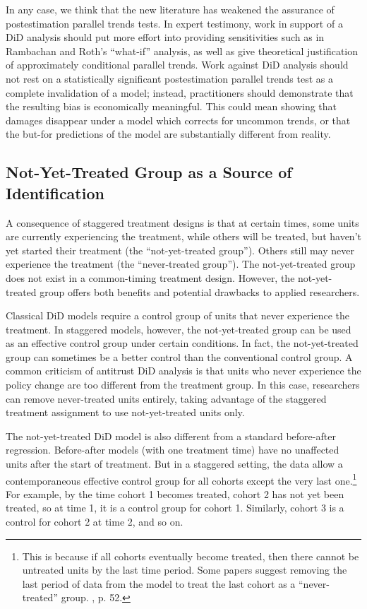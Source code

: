 \documentclass[12pt]{article}
\begin{document}
In any case, we think that the new literature has weakened the assurance of postestimation parallel trends tests. In expert testimony, work in support of a DiD analysis should put more effort into providing sensitivities such as in Rambachan and Roth’s “what-if” analysis, as well as give theoretical justification of approximately conditional parallel trends. Work against DiD analysis should not rest on a statistically significant postestimation parallel trends test as a complete invalidation of a model; instead, practitioners should demonstrate that the resulting bias is economically meaningful. This could mean showing that damages disappear under a model which corrects for uncommon trends, or that the but-for predictions of the model are substantially different from reality.
\subsection{Not-Yet-Treated Group as a Source of Identification} \label{sec:notyettreated}
A consequence of staggered treatment designs is that at certain times, some units are currently experiencing the treatment, while others will be treated, but haven’t yet started their treatment (the “not-yet-treated group”). Others still may never experience the treatment (the “never-treated group”). The not-yet-treated group does not exist in a common-timing treatment design. However, the not-yet-treated group offers both benefits and potential drawbacks to applied researchers.

Classical DiD models require a control group of units that never experience the treatment. In staggered models, however, the not-yet-treated group can be used as an effective control group under certain conditions. In fact, the not-yet-treated group can sometimes be a better control than the conventional control group. A common criticism of antitrust DiD analysis is that units who never experience the policy change are too different from the treatment group. In this case, researchers can remove never-treated units entirely, taking advantage of the staggered treatment assignment to use not-yet-treated units only.

The not-yet-treated DiD model is also different from a standard before-after regression. Before-after models (with one treatment time) have no unaffected units after the start of treatment. But in a staggered setting, the data allow a contemporaneous effective control group for all cohorts except the very last one.\footnote{This is because if all cohorts eventually become treated, then there cannot be untreated units by the last time period. Some papers suggest removing the last period of data from the model to treat the last cohort as a “never-treated” group. \citet{wooldridge2021two}, p. 52.}  For example, by the time cohort 1 becomes treated, cohort 2 has not yet been treated, so at time 1, it is a control group for cohort 1. Similarly, cohort 3 is a control for cohort 2 at time 2, and so on.
\end{document}
